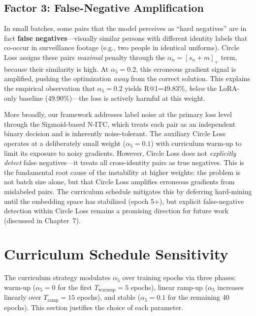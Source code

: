 \documentclass[../main.tex]{subfiles}
\begin{document}
\subsection*{Factor 3: False-Negative Amplification}

In small batches, some pairs that the model perceives as ``hard negatives'' are in fact \textbf{false negatives}---visually similar persons with different identity labels that co-occur in surveillance footage (e.g., two people in identical uniforms). Circle Loss assigns these pairs \textit{maximal} penalty through the $\alpha_n = [s_n + m]_+$ term, because their similarity is high. At $\alpha_5{=}0.2$, this erroneous gradient signal is amplified, pushing the optimization \textit{away} from the correct solution. This explains the empirical observation that $\alpha_5{=}0.2$ yields R@1=49.83\%, \textit{below} the LoRA-only baseline (49.90\%)---the loss is actively harmful at this weight.

More broadly, our framework addresses label noise at the primary loss level through the Sigmoid-based N-ITC, which treats each pair as an independent binary decision and is inherently noise-tolerant. The auxiliary Circle Loss operates at a deliberately small weight ($\alpha_5{=}0.1$) with curriculum warm-up to limit its exposure to noisy gradients. However, Circle Loss does not \textit{explicitly detect} false negatives---it treats all cross-identity pairs as true negatives. This is the fundamental root cause of the instability at higher weights: the problem is not batch size alone, but that Circle Loss amplifies erroneous gradients from mislabeled pairs. The curriculum schedule mitigates this by deferring hard-mining until the embedding space has stabilized (epoch 5+), but explicit false-negative detection within Circle Loss remains a promising direction for future work (discussed in Chapter~7).

\section{Curriculum Schedule Sensitivity}
\label{sec:curriculum_sensitivity}

The curriculum strategy modulates $\alpha_5$ over training epochs via three phases: warm-up ($\alpha_5{=}0$ for the first $T_{\text{warmup}}{=}5$ epochs), linear ramp-up ($\alpha_5$ increases linearly over $T_{\text{ramp}}{=}15$ epochs), and stable ($\alpha_5{=}0.1$ for the remaining 40 epochs). This section justifies the choice of each parameter.
\end{document}
